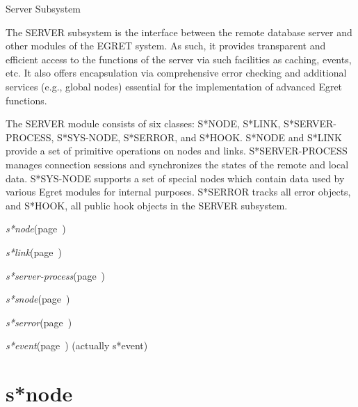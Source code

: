 \begin{description}
\item [Name:]  Server Subsystem

\item [Description:]
The SERVER subsystem is the interface between the remote
database server and other modules of the EGRET system. As
such, it provides transparent and efficient access to the
functions of the server via such facilities as caching,
events, etc. It also offers encapsulation via
comprehensive error checking and additional services
(e.g., global nodes) essential for the implementation of
advanced Egret functions.

The SERVER module consists of six classes: S*NODE, S*LINK,
S*SERVER-PROCESS, S*SYS-NODE, S*SERROR, and S*HOOK.
S*NODE and S*LINK provide a set of primitive operations on
nodes and links. S*SERVER-PROCESS manages connection
sessions and synchronizes the states of the remote and
local data. S*SYS-NODE supports a set of special nodes
which contain data used by various Egret modules for
internal purposes. S*SERROR tracks all error objects, and
S*HOOK, all public hook objects in the SERVER subsystem. 

\item [Public-classes:]
\item {\sl s*node}\hfill(page~\pageref{s*node})
\item {\sl s*link}\hfill(page~\pageref{s*link})
\item {\sl s*server-process}\hfill(page~\pageref{s*server-process})
\item {\sl s*snode}\hfill(page~\pageref{s*snode})
\item {\sl s*serror}\hfill(page~\pageref{s*serror})
\item {\sl s*event}\hfill(page~\pageref{s*event})  (actually s*event)

\item [Private-classes:]




\end{description}
\horizontalline

\section{s*node}
\label{s*node}

